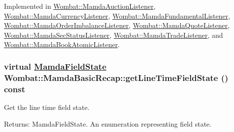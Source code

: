 Implemented in \hyperlink{classWombat_1_1MamdaAuctionListener_e9c0fa0d65584e373f0e645566428a8e}{Wombat::Mamda\-Auction\-Listener}, \hyperlink{classWombat_1_1MamdaCurrencyListener_1f9fa224749c87c92668bf55bcb2cfa5}{Wombat::Mamda\-Currency\-Listener}, \hyperlink{classWombat_1_1MamdaFundamentalListener_d3e5f97ea0ada9b6db4a8b59e3711da8}{Wombat::Mamda\-Fundamental\-Listener}, \hyperlink{classWombat_1_1MamdaOrderImbalanceListener_39ab83f80c21af82d0327dbb11a517d3}{Wombat::Mamda\-Order\-Imbalance\-Listener}, \hyperlink{classWombat_1_1MamdaQuoteListener_4aa61f82eb9452a38d2c483a5626b8b1}{Wombat::Mamda\-Quote\-Listener}, \hyperlink{classWombat_1_1MamdaSecStatusListener_e879990d8f32b1f28f5ab2fa5e20f441}{Wombat::Mamda\-Sec\-Status\-Listener}, \hyperlink{classWombat_1_1MamdaTradeListener_1bdc7c259fc34f4e4e43e2e97953ba97}{Wombat::Mamda\-Trade\-Listener}, and \hyperlink{classWombat_1_1MamdaBookAtomicListener_e390bbef9be51d4e4a63f3c7bab42926}{Wombat::Mamda\-Book\-Atomic\-Listener}.\hypertarget{classWombat_1_1MamdaBasicRecap_6576c042f1d1db20beb9397873d197c7}{
\subsubsection[getLineTimeFieldState]{\setlength{\rightskip}{0pt plus 5cm}virtual \hyperlink{namespaceWombat_93aac974f2ab713554fd12a1fa3b7d2a}{Mamda\-Field\-State} Wombat::Mamda\-Basic\-Recap::get\-Line\-Time\-Field\-State () const}}
\label{classWombat_1_1MamdaBasicRecap_6576c042f1d1db20beb9397873d197c7}


Get the line time field state. 

\begin{Desc}
\item[Returns:]Mamda\-Field\-State. An enumeration representing field state. \end{Desc}


